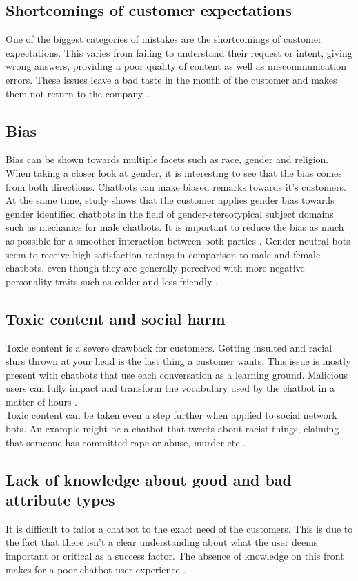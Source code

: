 \subsection{Shortcomings of customer expectations}
One of the biggest categories of mistakes are the shortcomings of customer expectations. This varies from failing to understand their request or intent, giving wrong answers, providing a poor quality of content as well as miscommunication errors. These issues leave a bad taste in the mouth of the customer and makes them not return to the company \citep*{Adamopoulou2020, Duka2021, Nichifor2021, Sheehan2020, Margot}.

\subsection{Bias}
Bias can be shown towards multiple facets such as race, gender and religion. When taking a closer look at gender, it is interesting to see that the bias comes from both directions. Chatbots can make biased remarks towards it's customers. At the same time, study shows that the customer applies gender bias towards gender identified chatbots in the field of gender-stereotypical subject domains such as mechanics for male chatbots. It is important to reduce the bias as much as possible for a smoother interaction between both parties \citep*{Adamopoulou2020, McDonnell2019}. Gender neutral bots seem to receive high satisfaction ratings in comparison to male and female chatbots, even though they are generally perceived with more negative personality traits such as colder and less friendly \citep{McDonnell2019}.

\subsection{Toxic content and social harm}
Toxic content is a severe drawback for customers. Getting insulted and racial slurs thrown at your head is the last thing a customer wants. This issue is mostly present with chatbots that use each conversation as a learning ground. Malicious users can fully impact and transform the vocabulary used by the chatbot in a matter of hours \citep{Adamopoulou2020}.\\
Toxic content can be taken even a step further when applied to social network bots. An example might be a chatbot that tweets about racist things, claiming that someone has committed rape or abuse, murder etc \citep{Radziwil2021}.

\subsection{Lack of knowledge about good and bad attribute types}
It is difficult to tailor a chatbot to the exact need of the customers. This is due to the fact that there isn't a clear understanding about what the user deems important or critical as a success factor. The absence of knowledge on this front makes for a poor chatbot user experience \citep{brandtzaeg2020}.


